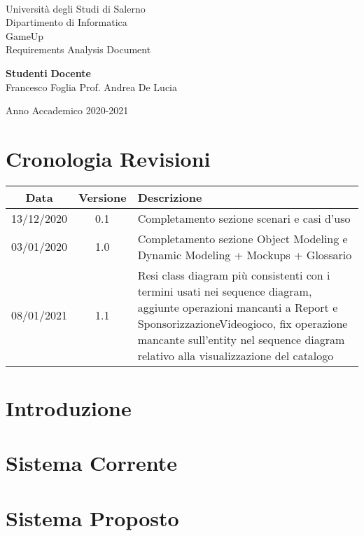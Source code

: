 \documentclass[11pt,oneside]{book}
\begin{document}

\begin{titlepage}
\begin{center}
\\[0.2truecm]
{\Large Universit\`a degli Studi di Salerno}\\[0.2truecm]
{\large Dipartimento di Informatica}\\
\hrulefill
\vfill
{\Large GameUp }\\[0.2truecm]
\vfill\vfill
{\Huge Requirements Analysis Document}
\vfill\vfill


{\bf Studenti} \hfill {\bf Docente}\ \ \\
Francesco Foglia \hfill Prof. Andrea De Lucia\\

\vfill
\hrulefill 

Anno Accademico 2020-2021

\end{center}
\end{titlepage}

\chapter*{Cronologia Revisioni}
\begin{center}
	\begin{tabular}{||c c p{10cm}||} 
	\hline
	Data & Versione & Descrizione \\ [0.5ex] 
	\hline\hline
	13/12/2020 & 0.1 & Completamento sezione scenari e casi d’uso \\ 
	\hline
	03/01/2020 & 1.0 & Completamento sezione Object Modeling e Dynamic Modeling + Mockups + Glossario \\
	\hline
	08/01/2021 & 1.1 & Resi class diagram più consistenti con i termini usati nei sequence diagram,
	aggiunte operazioni mancanti a Report e SponsorizzazioneVideogioco, fix operazione mancante sull’entity nel
	sequence diagram relativo alla visualizzazione del catalogo \\
	\hline
   \end{tabular}
\end{center}

\tableofcontents
\pagestyle{plain}

\chapter{Introduzione}
\setcounter{page}{1} 	%

 
\chapter{Sistema Corrente}


\chapter{Sistema Proposto}


\end{document}
